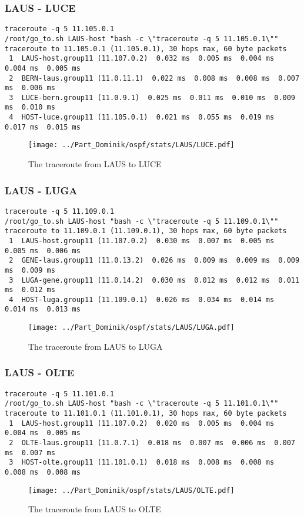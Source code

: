 \subsubsection{LAUS - LUCE}
\begin{lstlisting}
traceroute -q 5 11.105.0.1
/root/go_to.sh LAUS-host "bash -c \"traceroute -q 5 11.105.0.1\""
traceroute to 11.105.0.1 (11.105.0.1), 30 hops max, 60 byte packets
 1  LAUS-host.group11 (11.107.0.2)  0.032 ms  0.005 ms  0.004 ms  0.004 ms  0.005 ms
 2  BERN-laus.group11 (11.0.11.1)  0.022 ms  0.008 ms  0.008 ms  0.007 ms  0.006 ms
 3  LUCE-bern.group11 (11.0.9.1)  0.025 ms  0.011 ms  0.010 ms  0.009 ms  0.010 ms
 4  HOST-luce.group11 (11.105.0.1)  0.021 ms  0.055 ms  0.019 ms  0.017 ms  0.015 ms
\end{lstlisting}
\begin{figure}[H]
\centering
\texttt{[image: ../Part\_Dominik/ospf/stats/LAUS/LUCE.pdf]}
\caption{The traceroute from LAUS to LUCE}
\end{figure}
\clearpage
\subsubsection{LAUS - LUGA}
\begin{lstlisting}
traceroute -q 5 11.109.0.1
/root/go_to.sh LAUS-host "bash -c \"traceroute -q 5 11.109.0.1\""
traceroute to 11.109.0.1 (11.109.0.1), 30 hops max, 60 byte packets
 1  LAUS-host.group11 (11.107.0.2)  0.030 ms  0.007 ms  0.005 ms  0.005 ms  0.006 ms
 2  GENE-laus.group11 (11.0.13.2)  0.026 ms  0.009 ms  0.009 ms  0.009 ms  0.009 ms
 3  LUGA-gene.group11 (11.0.14.2)  0.030 ms  0.012 ms  0.012 ms  0.011 ms  0.012 ms
 4  HOST-luga.group11 (11.109.0.1)  0.026 ms  0.034 ms  0.014 ms  0.014 ms  0.013 ms
\end{lstlisting}
\begin{figure}[H]
\centering
\texttt{[image: ../Part\_Dominik/ospf/stats/LAUS/LUGA.pdf]}
\caption{The traceroute from LAUS to LUGA}
\end{figure}
\clearpage
\subsubsection{LAUS - OLTE}
\begin{lstlisting}
traceroute -q 5 11.101.0.1
/root/go_to.sh LAUS-host "bash -c \"traceroute -q 5 11.101.0.1\""
traceroute to 11.101.0.1 (11.101.0.1), 30 hops max, 60 byte packets
 1  LAUS-host.group11 (11.107.0.2)  0.020 ms  0.005 ms  0.004 ms  0.004 ms  0.005 ms
 2  OLTE-laus.group11 (11.0.7.1)  0.018 ms  0.007 ms  0.006 ms  0.007 ms  0.007 ms
 3  HOST-olte.group11 (11.101.0.1)  0.018 ms  0.008 ms  0.008 ms  0.008 ms  0.008 ms
\end{lstlisting}
\begin{figure}[H]
\centering
\texttt{[image: ../Part\_Dominik/ospf/stats/LAUS/OLTE.pdf]}
\caption{The traceroute from LAUS to OLTE}
\end{figure}
\clearpage
